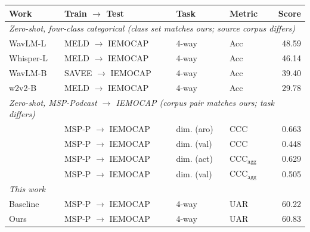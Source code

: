 %
\begin{tabular}{llllr}
\toprule
Work & Train $\rightarrow$ Test & Task & Metric & Score \\
\midrule
\multicolumn{5}{l}{\emph{Zero-shot, four-class categorical (class set matches ours; source corpus differs)}} \\
\cite{ma2024emobox} WavLM-L    & MELD $\rightarrow$ IEMOCAP    & 4-way & Acc & 48.59 \\
\cite{ma2024emobox} Whisper-L  & MELD $\rightarrow$ IEMOCAP    & 4-way & Acc & 46.14 \\
\cite{ma2024emobox} WavLM-B    & SAVEE $\rightarrow$ IEMOCAP   & 4-way & Acc & 39.40 \\
\cite{ma2024emobox} w2v2-B     & MELD $\rightarrow$ IEMOCAP    & 4-way & Acc & 29.78 \\
\midrule
\multicolumn{5}{l}{\emph{Zero-shot, MSP-Podcast $\rightarrow$ IEMOCAP (corpus pair matches ours; task differs)}} \\
\cite{wagner2023dawn}   & MSP-P $\rightarrow$ IEMOCAP & dim. (aro) & CCC & 0.663 \\
\cite{wagner2023dawn}   & MSP-P $\rightarrow$ IEMOCAP & dim. (val) & CCC & 0.448 \\
\cite{tavernor2025more} & MSP-P $\rightarrow$ IEMOCAP & dim. (act) & CCC$_{\mathrm{agg}}$ & 0.629 \\
\cite{tavernor2025more} & MSP-P $\rightarrow$ IEMOCAP & dim. (val) & CCC$_{\mathrm{agg}}$ & 0.505 \\
\midrule
\multicolumn{5}{l}{\emph{This work}} \\
Baseline          & MSP-P $\rightarrow$ IEMOCAP & 4-way & UAR & 60.22 \\
Ours              & MSP-P $\rightarrow$ IEMOCAP & 4-way & UAR & 60.83 \\
\bottomrule
\end{tabular}

